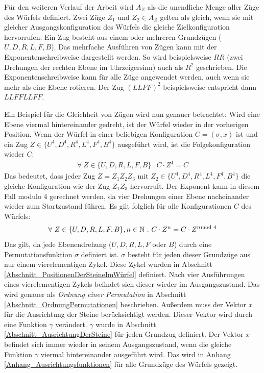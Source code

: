 \documentclass[12pt,a4paper, usenames, dvipsnames]{article}
\theoremstyle{mystyle}
\theoremstyle{definition}
\begin{document}
\label{Abschnitt_GleichheitVonZügen}

Für den weiteren Verlauf der Arbeit wird $A_Z$ als die unendliche Menge aller Züge des Würfels definiert. Zwei Züge $Z_1$ und $Z_2 \in A_Z$ gelten als gleich, wenn sie mit gleicher Ausgangskonfiguration des Würfels die gleiche Zielkonfiguration hervorrufen. 
Ein Zug besteht aus einem oder mehreren Grundzügen ($U, D, R, L, F, B$).
Das mehrfache Ausführen von Zügen kann mit der Exponentenschreibweise dargestellt werden. So wird beispielsweise $RR$ (zwei Drehungen der rechten Ebene im Uhrzeigersinn) auch als $R^2$ geschrieben. Die Exponentenschreibweise kann für alle Züge angewendet werden, auch wenn sie mehr als eine Ebene rotieren. Der Zug $(LLFF)^2$ beispielsweise entspricht dann $LLFFLLFF$. 

Ein Beispiel für die Gleichheit von Zügen wird nun genauer betrachtet: Wird eine Ebene viermal hintereinander gedreht, ist der Würfel wieder in der vorherigen Position. Wenn der Würfel in einer beliebigen Konfiguration $C = (\sigma, x)$ ist und ein Zug $Z \in \{ U^4, D^4, R^4, L^4, F^4, B^4\}$ ausgeführt wird, ist die Folgekonfiguration wieder $C$:
\begin{align*}
\forall \ Z \in \{ U, D, R, L, F, B\} \ . \ C \cdot Z^4 = C  
\end{align*}
Das bedeutet, dass jeder Zug $Z = Z_1Z_2Z_3$ mit $Z_2 \in \{ U^4, D^4, R^4, L^4, F^4, B^4\}$ die gleiche Konfiguration wie der Zug $Z_1Z_3$ hervorruft.
Der Exponent kann in diesem Fall modulo 4 gerechnet werden, da vier Drehungen einer Ebene nacheinander wieder zum Startzustand führen. 
Es gilt folglich für alle Konfigurationen $C$ des Würfels:
\begin{align*}
\forall \  Z \in \{U, D, R, L, F, B\}, n \in \mathbb{N} \ . \ C \cdot Z^n= C \cdot Z^{n \hspace*{-0.5em} \mod 4}
\end{align*}
Das gilt, da jede Ebenendrehung ($U, D, R, L, F$ oder $B$) durch eine Permutationsfunktion $\sigma$ definiert ist. $\sigma$ besteht für jeden dieser Grundzüge aus nur einem vierelementigen Zykel. Diese Zykel wurden in Abschnitt \ref{Abschnitt_PositionenDerSteineImWürfel} definiert. Nach vier Ausführungen eines vierelementigen Zykels befindet sich dieser wieder im Ausgangszustand. Das wird genauer als \textit{Ordnung einer Permutation} in Abschnitt \ref{Abschnitt_OrdnungPermutationen} beschrieben. Außerdem muss der Vektor $x$ für die Ausrichtung der Steine berücksichtigt werden. Dieser Vektor wird durch eine Funktion $\gamma$ verändert. $\gamma$ wurde in Abschnitt \ref{Abschnitt_AusrichtungDerSteine} für jeden Grundzug definiert. Der Vektor $x$ befindet sich immer wieder in seinem Ausgangszustand, wenn die gleiche Funktion $\gamma$ viermal hintereinander ausgeführt wird. Das wird in Anhang \ref{Anhang_Ausrichtungsfunktionen} für alle Grundzüge des Würfels gezeigt.
\end{document}
